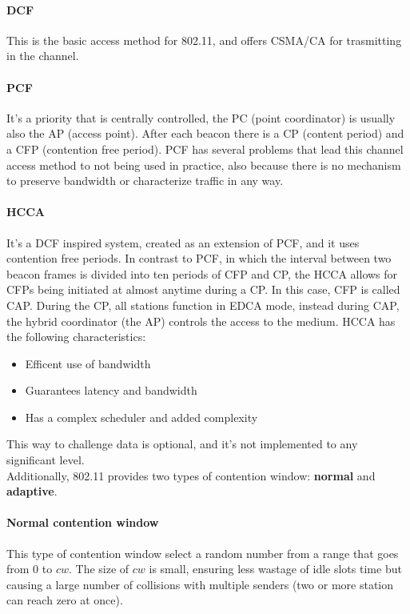 \paragraph*{DCF} This is the basic access method for 802.11, and offers CSMA/CA
for trasmitting in the channel.

\paragraph*{PCF} It's a priority that is centrally controlled, the PC (point
coordinator) is usually also the AP (access point).
After each beacon there is a CP (content period) and a CFP (contention free
period). PCF has several problems that lead this channel access method to not
being used in practice, also because there is no mechanism to preserve bandwidth
or characterize traffic in any way.

\paragraph*{HCCA} It's a DCF inspired system, created as an extension of PCF,
and it uses contention free periods. In contrast to PCF, in which the interval
between two beacon frames is divided into ten periods of CFP and CP, the HCCA
allows for CFPs being initiated at almost anytime during a CP. In this case,
CFP is called CAP. During the CP, all stations function in EDCA mode, instead
during CAP, the hybrid coordinator (the AP) controls the access to the medium.
HCCA has the following characteristics:
\begin{itemize}
\item Efficent use of bandwidth
\item Guarantees latency and bandwidth
\item Has a complex scheduler and added complexity
\end{itemize}

This way to challenge data is optional, and it's not implemented to any
significant level.\\[5pt]


\noindent Additionally, 802.11 provides two types of contention window:
\textbf{normal} and
\textbf{adaptive}.

\paragraph*{Normal contention window} This type of contention window select a
random number from a range that goes from 0 to $cw$. The size of $cw$ is small, ensuring less
wastage of idle slots time but causing a large number of collisions with
multiple senders (two or more station can reach zero at once).

